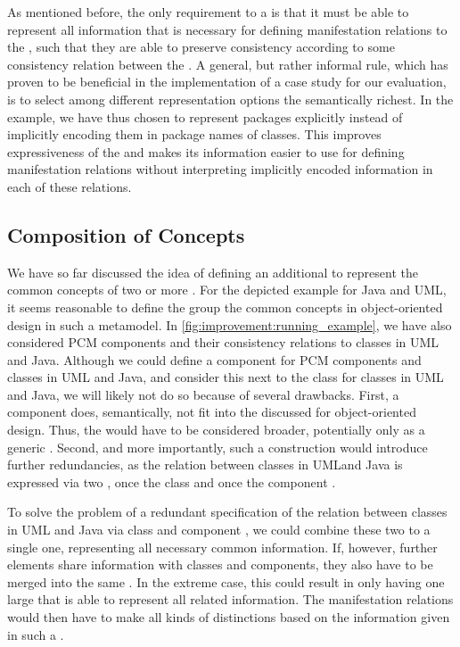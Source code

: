 As mentioned before, the only requirement to a \conceptmetamodel is that it must be able to represent all information that is necessary for defining manifestation relations to the \concretemetamodels, such that they are able to preserve consistency according to some consistency relation between the \concretemetamodels.
A general, but rather informal rule, which has proven to be beneficial in the implementation of a case study for our evaluation, is to select among different representation options the semantically richest.
In the example, we have thus chosen to represent packages explicitly instead of implicitly encoding them in package names of classes.
This improves expressiveness of the \conceptmetamodel and makes its information easier to use for defining manifestation relations without interpreting implicitly encoded information in each of these relations.


\subsection{Composition of Concepts}
\label{chap:improvement:commonalities:composition}

We have so far discussed the idea of defining an additional \conceptmetamodel to represent the common concepts of two or more \concretemetamodels.
For the depicted example for Java and \gls{UML}, it seems reasonable to define the group the common concepts in object-oriented design in such a metamodel.
In \autoref{fig:improvement:running_example}, we have also considered \gls{PCM} components and their consistency relations to classes in \gls{UML} and Java.
Although we could define a component \commonality for \gls{PCM} components and classes in \gls{UML} and Java, and consider this \commonality next to the class \commonality for classes in \gls{UML} and Java, we will likely not do so because of several drawbacks.
First, a component \commonality does, semantically, not fit into the discussed \conceptmetamodel for object-oriented design. Thus, the \conceptmetamodel would have to be considered broader, potentially only as a generic \conceptmetamodel.
Second, and more importantly, such a construction would introduce further redundancies, as the relation between classes in \gls{UML}and Java is expressed via two \commonalities, once the class \commonality and once the component \commonality.

To solve the problem of a redundant specification of the relation between classes in \gls{UML} and Java via class and component \commonalities, we could combine these two \commonalities to a single one, representing all necessary common information.
If, however, further elements share information with classes and components, they also have to be merged into the same \commonality.
In the extreme case, this could result in only having one large \commonality that is able to represent all related information.
The manifestation relations would then have to make all kinds of distinctions based on the information given in such a \commonality.

